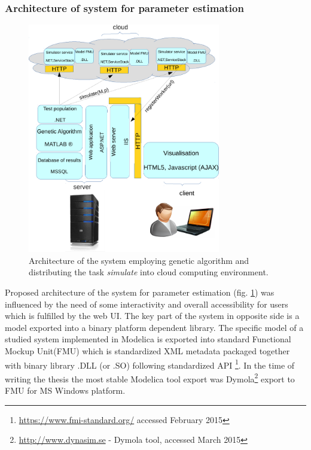 \subsubsection{Architecture of system for parameter estimation}
\begin{figure}[hbt]
    \centering
     \includegraphics[page=1,width=0.75\textwidth]{chapter3/architekturaestimation-crop.pdf}  
    \caption{Architecture of the system employing genetic algorithm and distributing the task \emph{simulate} into cloud computing environment.}
    \label{fig:architectureestimation}
\end{figure}
Proposed architecture of the system for parameter estimation (fig. \ref{fig:architectureestimation}) was influenced by the need of some interactivity and overall accessibility for users which is fulfilled by the web UI. The key part of the system in opposite side is a model exported into a binary platform dependent library. 
The specific model of a studied system implemented in Modelica is exported into standard Functional Mockup Unit(FMU)  which is standardized XML metadata packaged together with  binary library .DLL (or .SO) following standardized API \cite{Blochwitza}\footnote{\url{https://www.fmi-standard.org/} accessed February 2015}. In the time of writing the thesis the most stable Modelica tool export was Dymola\footnote{\url{http://www.dynasim.se} - Dymola tool, accessed March 2015} export to FMU for MS Windows platform. 

